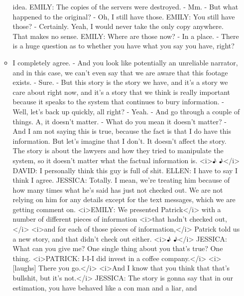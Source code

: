 \begin{itemize}
\begin{itemize}
    idea. EMILY: The copies of the servers were destroyed. - Mm. - But
    what happened to the original? - Oh, I still have those. EMILY: You
    still have those? - Certainly. Yeah, I would never take the only
    copy anywhere. That makes no sense. EMILY: Where are those now? - In
    a place. - There is a huge question as to whether you have what you
    say you have, right?
  \item
    I completely agree. - And you look like potentially an unreliable
    narrator, and in this case, we can't even say that we are aware that
    this footage exists. - Sure. - But this story is the story we have,
    and it's a story we care about right now, and it's a story that we
    think is really important because it speaks to the system that
    continues to bury information. - Well, let's back up quickly, all
    right? - Yeah. - And go through a couple of things. A, it doesn't
    matter. - What do you mean it doesn't matter? - And I am not saying
    this is true, because the fact is that I do have this information.
    But let's imagine that I don't. It doesn't affect the story. The
    story is about the lawyers and how they tried to manipulate the
    system, so it doesn't matter what the factual information is.
    \textless{}i\textgreater{}♪ ♪\textless{}/i\textgreater{} DAVID: I
    personally think this guy is full of shit. ELLEN: I have to say I
    think I agree. JESSICA: Totally. I mean, we're treating him because
    of how many times what he's said has just not checked out. We are
    not relying on him for any details except for the text messages,
    which we are getting comment on. \textless{}i\textgreater{}EMILY: We
    presented Patrick\textless{}/i\textgreater{} with a number of
    different pieces of information \textless{}i\textgreater{}that
    hadn't checked out,\textless{}/i\textgreater{}
    \textless{}i\textgreater{}and for each of those pieces of
    information,\textless{}/i\textgreater{} Patrick told us a new story,
    and that didn't check out either. \textless{}i\textgreater{}♪
    ♪\textless{}/i\textgreater{} JESSICA: What can you give me? One
    single thing about you that's true? One thing.
    \textless{}i\textgreater{}PATRICK: I-I-I did invest in a coffee
    company.\textless{}/i\textgreater{}
    \textless{}i\textgreater{}{[}laughs{]} There you
    go.\textless{}/i\textgreater{} \textless{}i\textgreater{}And I know
    that you think that that's bullshit, but it's
    not.\textless{}/i\textgreater{} JESSICA: The story is gonna say that
    in our estimation, you have behaved like a con man and a liar, and

\end{itemize}
\end{itemize}
